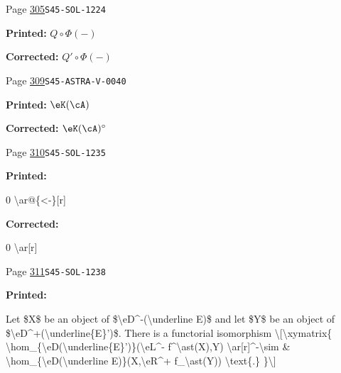 \documentclass[oneside]{book}
\theoremstyle{sga-source}
\theoremstyle{sga-source-dash}
\theoremstyle{sga-source-dotdash}
\theoremstyle{sga-source-number-note-dash}
\theoremstyle{sga-source-note-number-dotdash}
\theoremstyle{sga-source-example-dotdash}
\theoremstyle{sga-source-inline-number}
\theoremstyle{sga-source-bare-number}
\theoremstyle{sga-source}
\begin{document}
\begin{description}
\smallskip
\item[\hypertarget{apparatus:EN-0215}{215}] Page \hyperlink{printpage:en:305}{305}\quad\texttt{S45-SOL-1224}
\par\noindent\textbf{Printed:} \(Q\circ \Phi(-)\)
\par\noindent\textbf{Corrected:} \(Q'\circ \Phi(-)\)
\smallskip
\item[\hypertarget{apparatus:EN-0216}{216}] Page \hyperlink{printpage:en:309}{309}\quad\texttt{S45-ASTRA-V-0040}
\par\noindent\textbf{Printed:} \(\eK(\cA)\)
\par\noindent\textbf{Corrected:} \(\eK(\cA)^\circ\)
\smallskip
\item[\hypertarget{apparatus:EN-0217}{217}] Page \hyperlink{printpage:en:310}{310}\quad\texttt{S45-SOL-1235}
\par\noindent\textbf{Printed:} {\footnotesize\ttfamily\raggedright 0 \textbackslash{}\allowbreak{}ar@\{\allowbreak{}<-\allowbreak{}\}\allowbreak{}[\allowbreak{}r]\allowbreak{}\par}
\par\noindent\textbf{Corrected:} {\footnotesize\ttfamily\raggedright 0 \textbackslash{}\allowbreak{}ar[\allowbreak{}r]\allowbreak{}\par}
\smallskip
\item[\hypertarget{apparatus:EN-0218}{218}] Page \hyperlink{printpage:en:311}{311}\quad\texttt{S45-SOL-1238}
\par\noindent\textbf{Printed:} {\footnotesize\ttfamily\raggedright Let \$X\$ be an object of \$\textbackslash{}\allowbreak{}eD\textasciicircum{}\allowbreak{}-\allowbreak{}(\allowbreak{}\textbackslash{}\allowbreak{}underline E)\allowbreak{}\$ and let \$Y\$ be an object of \$\textbackslash{}\allowbreak{}eD\textasciicircum{}\allowbreak{}+\allowbreak{}(\allowbreak{}\textbackslash{}\allowbreak{}underline\{\allowbreak{}E\}\allowbreak{}')\allowbreak{}\$. There is a functorial isomorphism \textbackslash{}\allowbreak{}[\allowbreak{}\textbackslash{}\allowbreak{}xymatrix\{\allowbreak{}   \textbackslash{}\allowbreak{}hom\_\allowbreak{}\{\allowbreak{}\textbackslash{}\allowbreak{}eD(\allowbreak{}\textbackslash{}\allowbreak{}underline\{\allowbreak{}E\}\allowbreak{}')\allowbreak{}\}\allowbreak{}(\allowbreak{}\textbackslash{}\allowbreak{}eL\textasciicircum{}\allowbreak{}-\allowbreak{} f\textasciicircum{}\allowbreak{}\textbackslash{}\allowbreak{}ast(\allowbreak{}X)\allowbreak{},\allowbreak{}Y)\allowbreak{} \textbackslash{}\allowbreak{}ar[\allowbreak{}r]\allowbreak{}\textasciicircum{}\allowbreak{}-\allowbreak{}\textbackslash{}\allowbreak{}sim     \& \textbackslash{}\allowbreak{}hom\_\allowbreak{}\{\allowbreak{}\textbackslash{}\allowbreak{}eD(\allowbreak{}\textbackslash{}\allowbreak{}underline E)\allowbreak{}\}\allowbreak{}(\allowbreak{}X,\allowbreak{}\textbackslash{}\allowbreak{}eR\textasciicircum{}\allowbreak{}+\allowbreak{} f\_\allowbreak{}\textbackslash{}\allowbreak{}ast(\allowbreak{}Y)\allowbreak{})\allowbreak{} \textbackslash{}\allowbreak{}text\{\allowbreak{}.\}\allowbreak{} \}\allowbreak{}\textbackslash{}\allowbreak{}]\allowbreak{}\par}

\end{description}
\end{document}
